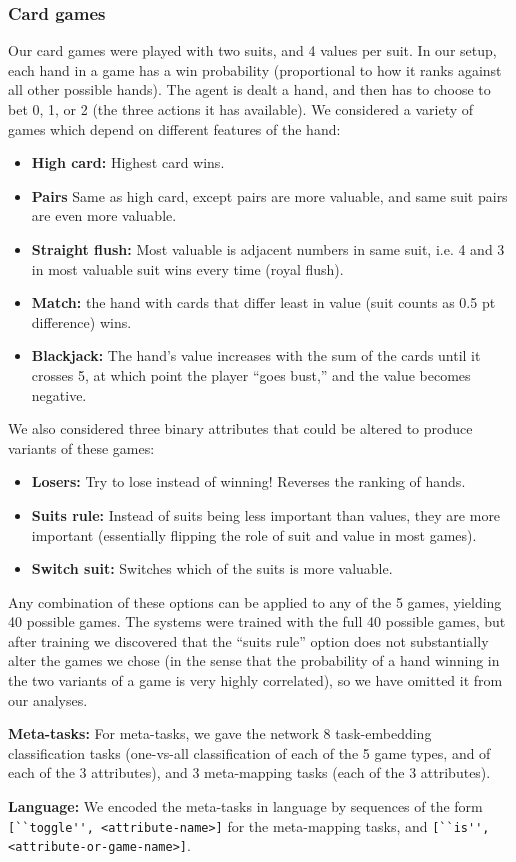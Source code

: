 \subsubsection{Card games}
\label{meth_data_cards}
Our card games were played with two suits, and 4 values per suit. In our setup, each hand in a game has a win probability (proportional to how it ranks against all other possible hands). The agent is dealt a hand, and then has to choose to bet 0, 1, or 2 (the three actions it has available). We considered a variety of games which depend on different features of the hand: 
\begin{itemize}
\item \textbf{High card:} Highest card wins.
\item \textbf{Pairs} Same as high card, except pairs are more valuable, and same suit pairs are even more valuable.
\item \textbf{Straight flush:} Most valuable is adjacent numbers in same suit, i.e. 4 and 3 in most valuable suit wins every time (royal flush).
\item \textbf{Match:} the hand with cards that differ least in value (suit counts as 0.5 pt difference) wins.
\item \textbf{Blackjack:} The hand's value increases with the sum of the cards until it crosses 5, at which point the player ``goes bust,'' and the value becomes negative. 
\end{itemize}
We also considered three binary attributes that could be altered to produce variants of these games:
\begin{itemize}
\item \textbf{Losers:} Try to lose instead of winning! Reverses the ranking of hands.
\item \textbf{Suits rule:} Instead of suits being less important than values, they are more important (essentially flipping the role of suit and value in most games).
\item \textbf{Switch suit:} Switches which of the suits is more valuable.
\end{itemize}
Any combination of these options can be applied to any of the 5 games, yielding 40 possible games. The systems were trained with the full 40 possible games, but after training we discovered that the ``suits rule'' option does not substantially alter the games we chose (in the sense that the probability of a hand winning in the two variants of a game is very highly correlated), so we have omitted it from our analyses.\par
\textbf{Meta-tasks:} For meta-tasks, we gave the network 8 task-embedding classification tasks (one-vs-all classification of each of the 5 game types, and of each of the 3 attributes), and 3 meta-mapping tasks (each of the 3 attributes). \par
\textbf{Language:} We encoded the meta-tasks in language by sequences of the form \verb|[``toggle'', <attribute-name>]| for the meta-mapping tasks, and \verb|[``is'', <attribute-or-game-name>]|.
